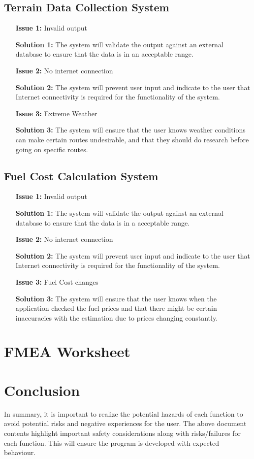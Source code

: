 \documentclass{article}
\begin{document}
\subsection{Terrain Data Collection System}
\begin{itemize}
	\item[\textbf{Issue 1:}] Invalid output
	\item[\textbf{Solution 1:}] The system will validate the output against an external database to ensure that the data is in an acceptable range.
	\item[\textbf{Issue 2:}] No internet connection
	\item[\textbf{Solution 2:}] The system will prevent user input and indicate to the user that Internet connectivity is required for the functionality of the system.
	\item[\textbf{Issue 3:}] Extreme Weather
	\item[\textbf{Solution 3:}] The system will ensure that the user knows weather conditions can make certain routes undesirable, and that they 
	should do research before going on specific routes.
\end{itemize}

\subsection{Fuel Cost Calculation System}
\begin{itemize}
	\item[\textbf{Issue 1:}] Invalid output
	\item[\textbf{Solution 1:}] The system will validate the output against an external database to ensure that the data is in a acceptable range.
	\item[\textbf{Issue 2:}] No internet connection
	\item[\textbf{Solution 2:}] The system will prevent user input and indicate to the user that Internet connectivity is required for the functionality of the system.
	\item[\textbf{Issue 3:}] Fuel Cost changes
	\item[\textbf{Solution 3:}] The system will ensure that the user knows when the application checked the fuel prices and that there might be certain inaccuracies 
	with the estimation due to prices changing constantly.
\end{itemize}

\section{FMEA Worksheet}

\section{Conclusion}
In summary, it is important to realize the potential hazards of each function to avoid potential risks and negative experiences for the user. The above document contents highlight
important safety considerations along with risks/failures for each function. This will ensure
the program is developed with expected behaviour.
\end{document}

